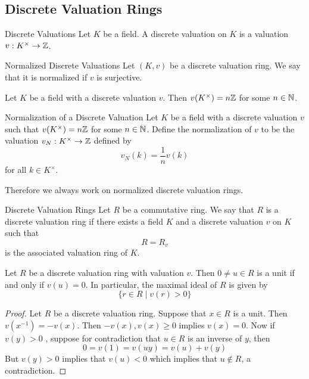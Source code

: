 \documentclass[a4paper]{article}
\begin{document}
\subsection{Discrete Valuation Rings}
\begin{defn}{Discrete Valuations}{} Let $K$ be a field. A discrete valuation on $K$ is a valuation $v:K^\times\to\mathbb{Z}$. 
\end{defn}

\begin{defn}{Normalized Discrete Valuations}{} Let $(K,v)$ be a discrete valuation ring. We say that it is normalized if $v$ is surjective. 
\end{defn}

\begin{lmm}{}{} Let $K$ be a field with a discrete valuation $v$. Then $v(K^\times)=n\mathbb{Z}$ for some $n\in\mathbb{N}$. 
\end{lmm}

\begin{lmm}{Normalization of a Discrete Valuation}{} Let $K$ be a field with a discrete valuation $v$ such that $v(K^\times)=n\mathbb{Z}$ for some $n\in\mathbb{N}$. Define the normalization of $v$ to be the valuation $v_N:K^\times\to\mathbb{Z}$ defined by $$v_N(k)=\frac{1}{n}v(k)$$ for all $k\in K^\times$. 
\end{lmm}

Therefore we always work on normalized discrete valuation rings. 

\begin{defn}{Discrete Valuation Rings}{} Let $R$ be a commutative ring. We say that $R$ is a discrete valuation ring if there exists a field $K$ and a discrete valuation $v$ on $K$ such that $$R=R_v$$ is the associated valuation ring of $K$. 
\end{defn}

\begin{lmm}{}{} Let $R$ be a discrete valuation ring with valuation $v$. Then $0\neq u\in R$ is a unit if and only if $v(u)=0$. In particular, the maximal ideal of $R$ is given by $$\{r\in R\;|\;v(r)>0\}$$ \tcbline
\begin{proof}
Let $R$ be a discrete valuation ring. Suppose that $x\in R$ is a unit. Then $v(x^{-1})=-v(x)$. Then $-v(x),v(x)\geq 0$ implies $v(x)=0$. Now if $v(y)>0$ , suppose for contradiction that $u\in R$ is an inverse of $y$, then $$0=v(1)=v(uy)=v(u)+v(y)$$ But $v(y)>0$ implies that $v(u)<0$ which implies that $u\notin R$, a contradiction. 
\end{proof}
\end{lmm}
\end{document}

